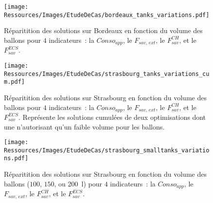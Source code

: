 
\begin{landscape}

\begin{figure}
    \centering
    \texttt{[image: Ressources/Images/EtudeDeCas/bordeaux\_tanks\_variations.pdf]}
    \caption[Réparitition des solutions en fonction des sous-groupes de taille de
             ballon pour Bordeaux]
            {Réparitition des solutions sur Bordeaux en fonction du volume des ballons
             pour $4$ indicateurs~: la $Conso_{app}$, le $F_{sav,\, ext}$,
             le $F_{sav}^{CH}$, et le $F_{sav}^{ECS}$.}
    \label{fig:tanks_variations_bordeaux}
\end{figure}

\begin{figure}
    \centering
    \texttt{[image: Ressources/Images/EtudeDeCas/strasbourg\_tanks\_variations\_cum.pdf]}
    \caption[Réparitition des solutions en fonction des sous-groupes de taille de
             ballon pour Strasbourg]
             {Réparitition des solutions sur Strasbourg en fonction du volume des ballons
             pour $4$ indicateurs~: la $Conso_{app}$, le $F_{sav,\, ext}$,
             le $F_{sav}^{CH}$, et le $F_{sav}^{ECS}$. Représente les solutions cumulées
             de deux optimisations dont une n’autorisant qu’un faible volume pour les
             ballons.}
    \label{fig:tanks_variations_strasbourg}
\end{figure}

\begin{figure}
    \centering
    \texttt{[image: Ressources/Images/EtudeDeCas/strasbourg\_smalltanks\_variations.pdf]}
    \caption[Réparitition des solutions en fonction de faibles volumes de ballons]
            {Réparitition des solutions sur Strasbourg en fonction du volume des ballons ($100$, $150$,
             ou \SI{200}{\litre}) pour $4$ indicateurs~: la $Conso_{app}$, le
             $F_{sav,\, ext}$, le $F_{sav}^{CH}$, et le $F_{sav}^{ECS}$.}
    \label{fig:tanks_small_variations_strasbourg}
\end{figure}

\end{landscape}
